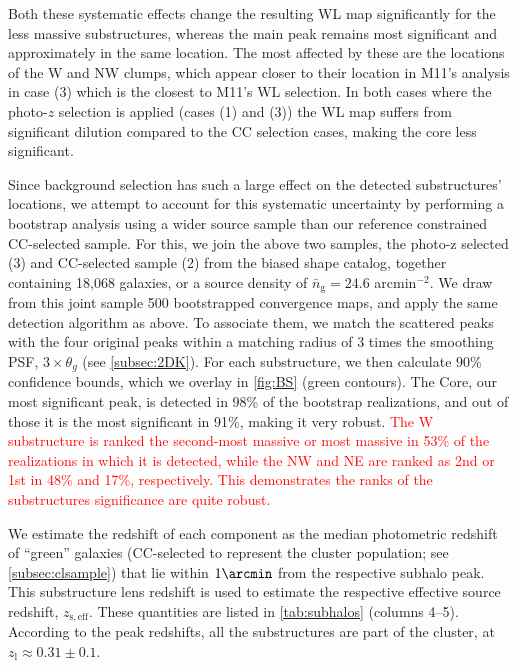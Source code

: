 \documentclass[iop,twocolumn]{emulateapj}
\begin{document}
Both these systematic effects change the resulting WL map significantly for the less massive substructures, whereas the main peak remains most significant and approximately in the same location. The most affected by these are the locations of the W and NW clumps, which appear closer to their location in M11's analysis in case (3) which is the closest to M11's WL selection. In both cases where the photo-$z$ selection is applied (cases (1) and (3)) the WL map suffers from significant dilution compared to the CC selection cases, making the core less significant.


Since background selection has such a large effect on the detected substructures' locations, we attempt to account for this systematic uncertainty by performing a bootstrap analysis using a wider source sample than our reference constrained CC-selected sample. For this, we join the above two samples, the photo-z selected (3) and CC-selected sample (2) from the biased shape catalog, together containing 18,068 galaxies, or a source density of $\bar{n}_\mathrm{g}=24.6$ arcmin$^{-2}$.
%
We draw from this joint sample 500 bootstrapped convergence maps, and apply the same detection algorithm as above. To associate them, we match the scattered peaks with the four original peaks within a matching radius of 3 times the smoothing PSF, $3\times\theta_g$ (see \autoref{subsec:2DK}). For each substructure, we then calculate $90\%$ confidence bounds, which we overlay in \autoref{fig:BS} (green contours).
The Core, our most significant peak,  is detected in 98\% of the bootstrap realizations, and out of those it is the most significant in 91\%, making it very robust. \textcolor{red}{The W substructure is ranked the second-most massive or most massive in 53\% of the realizations in which it is detected, while the NW and NE are ranked as 2nd or 1st in  48\% and 17\%, respectively. 
This demonstrates the ranks of the substructures significance are quite robust. }

We estimate the redshift of each component
as the median photometric redshift of ``green'' galaxies  (CC-selected to represent the cluster population; see \autoref{subsec:clsample}) that lie within $1\arcmin$ from the respective subhalo peak. This substructure lens redshift is used to estimate the respective effective source redshift, $z_\mathrm{s,eff}$. These quantities are listed in \autoref{tab:subhalos} (columns 4--5). According to the peak redshifts, all the substructures are part of the cluster, at $z_\mathrm{l}\approx0.31\pm0.1$.
\end{document}
